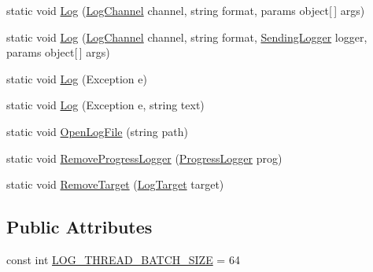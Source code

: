 \begin{DoxyCompactItemize}
\item 
static void \hyperlink{classOTA_1_1Logging_1_1ProgramLog_a75087e9a3e4cf75780d22e543f118401}{Log} (\hyperlink{classOTA_1_1Logging_1_1LogChannel}{Log\+Channel} channel, string format, params object\mbox{[}$\,$\mbox{]} args)
\item 
static void \hyperlink{classOTA_1_1Logging_1_1ProgramLog_a09d418ffab7a9023548edceed42768b5}{Log} (\hyperlink{classOTA_1_1Logging_1_1LogChannel}{Log\+Channel} channel, string format, \hyperlink{namespaceOTA_1_1Logging_a489c780cb72d9452216c06b7a0eec2a6}{Sending\+Logger} logger, params object\mbox{[}$\,$\mbox{]} args)
\item 
static void \hyperlink{classOTA_1_1Logging_1_1ProgramLog_a7e54aeac9e36bf3d787b1af8501f3f15}{Log} (Exception e)
\item 
static void \hyperlink{classOTA_1_1Logging_1_1ProgramLog_a5fce54e3e0d1752dac64fa80ffc147f4}{Log} (Exception e, string text)
\item 
static void \hyperlink{classOTA_1_1Logging_1_1ProgramLog_a3b8a4d1745574b816e7e22fdc54c3457}{Open\+Log\+File} (string path)
\item 
static void \hyperlink{classOTA_1_1Logging_1_1ProgramLog_a4191631e4fc4e45070d52d6eed9e3b25}{Remove\+Progress\+Logger} (\hyperlink{classOTA_1_1Logging_1_1ProgressLogger}{Progress\+Logger} prog)
\item 
static void \hyperlink{classOTA_1_1Logging_1_1ProgramLog_afdec47258b824c342754438db788b748}{Remove\+Target} (\hyperlink{classOTA_1_1Logging_1_1LogTarget}{Log\+Target} target)
\end{DoxyCompactItemize}
\subsection*{Public Attributes}
\begin{DoxyCompactItemize}
\item 
const int \hyperlink{classOTA_1_1Logging_1_1ProgramLog_a52b4c9fe9a153710726ef6d9cad3afca}{L\+O\+G\+\_\+\+T\+H\+R\+E\+A\+D\+\_\+\+B\+A\+T\+C\+H\+\_\+\+S\+I\+Z\+E} = 64
\end{DoxyCompactItemize}
